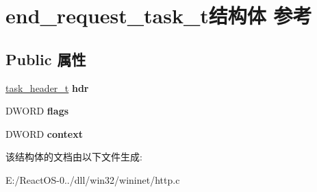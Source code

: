 \hypertarget{structend__request__task__t}{}\section{end\+\_\+request\+\_\+task\+\_\+t结构体 参考}
\label{structend__request__task__t}
\subsection*{Public 属性}
\begin{DoxyCompactItemize}
\item 
\mbox{\label{structend__request__task__t_a5453d664d99f88d78e5b49d3d7613173}} 
\hyperlink{structtask__header__t}{task\+\_\+header\+\_\+t} {\bfseries hdr}
\item 
\mbox{\label{structend__request__task__t_a747b9fff50e78492a84e7368ba89f7ce}} 
D\+W\+O\+RD {\bfseries flags}
\item 
\mbox{\label{structend__request__task__t_ab9ed19e9dba8bb738a4366d987957a37}} 
D\+W\+O\+RD {\bfseries context}
\end{DoxyCompactItemize}


该结构体的文档由以下文件生成\+:\begin{DoxyCompactItemize}
\item 
E\+:/\+React\+O\+S-\/0../dll/win32/wininet/http.\+c\end{DoxyCompactItemize}
